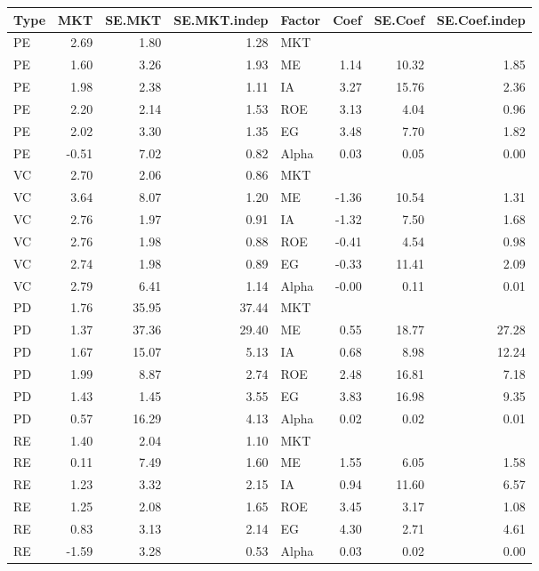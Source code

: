 \documentclass[12pt]{article}
\begin{document}
\begin{table}[ht]
	\centering
	\begin{tabular}{lrrrlrrr}
		\hline
		Type & MKT & SE.MKT & SE.MKT.indep & Factor & Coef & SE.Coef & SE.Coef.indep \\ 
		\hline
		PE & 2.69 & 1.80 & 1.28 & MKT &  &  &  \\ 
		PE & 1.60 & 3.26 & 1.93 & ME & 1.14 & 10.32 & 1.85 \\ 
		PE & 1.98 & 2.38 & 1.11 & IA & 3.27 & 15.76 & 2.36 \\ 
		PE & 2.20 & 2.14 & 1.53 & ROE & 3.13 & 4.04 & 0.96 \\ 
		PE & 2.02 & 3.30 & 1.35 & EG & 3.48 & 7.70 & 1.82 \\ 
		PE & -0.51 & 7.02 & 0.82 & Alpha & 0.03 & 0.05 & 0.00 \\ 
		VC & 2.70 & 2.06 & 0.86 & MKT &  &  &  \\ 
		VC & 3.64 & 8.07 & 1.20 & ME & -1.36 & 10.54 & 1.31 \\ 
		VC & 2.76 & 1.97 & 0.91 & IA & -1.32 & 7.50 & 1.68 \\ 
		VC & 2.76 & 1.98 & 0.88 & ROE & -0.41 & 4.54 & 0.98 \\ 
		VC & 2.74 & 1.98 & 0.89 & EG & -0.33 & 11.41 & 2.09 \\ 
		VC & 2.79 & 6.41 & 1.14 & Alpha & -0.00 & 0.11 & 0.01 \\ 
		PD & 1.76 & 35.95 & 37.44 & MKT &  &  &  \\ 
		PD & 1.37 & 37.36 & 29.40 & ME & 0.55 & 18.77 & 27.28 \\ 
		PD & 1.67 & 15.07 & 5.13 & IA & 0.68 & 8.98 & 12.24 \\ 
		PD & 1.99 & 8.87 & 2.74 & ROE & 2.48 & 16.81 & 7.18 \\ 
		PD & 1.43 & 1.45 & 3.55 & EG & 3.83 & 16.98 & 9.35 \\ 
		PD & 0.57 & 16.29 & 4.13 & Alpha & 0.02 & 0.02 & 0.01 \\ 
		RE & 1.40 & 2.04 & 1.10 & MKT &  &  &  \\ 
		RE & 0.11 & 7.49 & 1.60 & ME & 1.55 & 6.05 & 1.58 \\ 
		RE & 1.23 & 3.32 & 2.15 & IA & 0.94 & 11.60 & 6.57 \\ 
		RE & 1.25 & 2.08 & 1.65 & ROE & 3.45 & 3.17 & 1.08 \\ 
		RE & 0.83 & 3.13 & 2.14 & EG & 4.30 & 2.71 & 4.61 \\ 
		RE & -1.59 & 3.28 & 0.53 & Alpha & 0.03 & 0.02 & 0.00 \\ 

\end{tabular}
\end{table}
\end{document}
